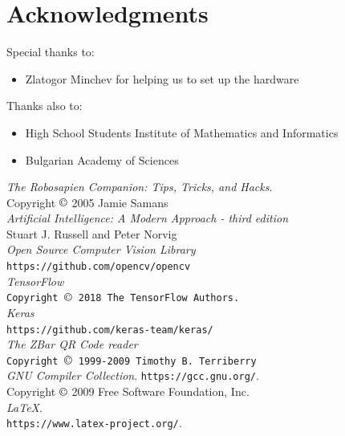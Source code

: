 \documentclass[a4paper, 12pt]{article}
\begin{document}
	\section{Acknowledgments}
	Special thanks to:
	\begin{itemize}
		\item Zlatogor Minchev for helping us to set up the hardware
	\end{itemize}
	Thanks also to:
	\begin{itemize}
		\item High School Students Institute of Mathematics and Informatics
		\item Bulgarian Academy of Sciences
	\end{itemize}
	\begin{thebibliography}{99}
		{\itshape The Robosapien Companion: Tips, Tricks, and Hacks}.\\
		Copyright $\copyright$ 2005 Jamie Samans\\
		{\itshape Artificial Intelligence: A Modern Approach - third edition}\\
		Stuart J. Russell and Peter Norvig\\
		
		{\itshape Open Source Computer Vision Library}\\
		\texttt{https://github.com/opencv/opencv} \\
		
		{\itshape TensorFlow}\\
		\texttt{Copyright $\copyright$ 2018 The TensorFlow Authors.} \\
		
		{\itshape Keras}\\
		\texttt{https://github.com/keras-team/keras/} \\
		
		{\itshape The ZBar QR Code reader} \\
		\texttt{Copyright $\copyright$ 1999-2009 Timothy B. Terriberry} \\
		
		{\itshape GNU Compiler Collection}.
		\texttt{https://gcc.gnu.org/}. \\
		Copyright $\copyright$  2009 Free Software Foundation, Inc. \\
		
		{\itshape \LaTeX}.\\
		\texttt{https://www.latex-project.org/}.
	\end{thebibliography}
\end{document}
